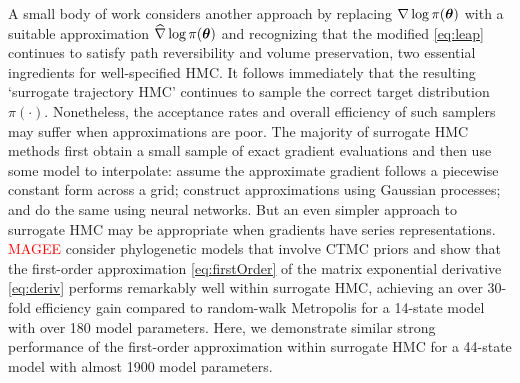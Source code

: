 \documentclass[12pt]{article} %
\begin{document}
A small body of work considers another approach by replacing $\nabla \log \pi (\boldsymbol{\theta})$ with a suitable approximation $\widehat{\nabla} \log \pi (\boldsymbol{\theta})$ and recognizing that the modified \eqref{eq:leap} continues to satisfy path reversibility and volume preservation, two essential ingredients for well-specified HMC. It follows immediately that the resulting `surrogate trajectory HMC' continues to sample the correct target distribution $\pi(\cdot)$.  Nonetheless, the acceptance rates and overall efficiency of such samplers may suffer when approximations are poor.   The majority of surrogate HMC methods first obtain a small sample of exact gradient evaluations and then use some model to interpolate: \citet{zhang2017precomputing} assume the approximate gradient follows a piecewise constant form across a grid; \citet{rasmussen2003gaussian,lan2016emulation} construct approximations using Gaussian processes; and \citet{zhang2017hamiltonian,li2019neural} do the same using neural networks.  But an even simpler approach to surrogate HMC may be appropriate when gradients have series representations.   \textcolor{red}{MAGEE} consider phylogenetic models that involve CTMC priors and show that the first-order approximation \eqref{eq:firstOrder} of the matrix exponential derivative \eqref{eq:deriv} performs remarkably well within surrogate HMC, achieving an over 30-fold efficiency gain compared to random-walk Metropolis for a 14-state model with over 180 model parameters.  Here, we demonstrate similar strong performance of the first-order approximation within surrogate HMC for a 44-state model with almost 1900 model parameters.
\end{document}
